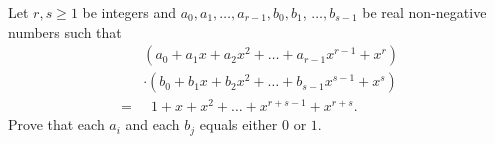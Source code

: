 \documentclass{article}
\begin{document}
\setlength{\parindent}{0pt}
Let $r,s\ge1$ be integers and $a_{0},a_{1},\dots,a_{r-1},b_{0},b_{1}$, $\dots,b_{s-1}$ be real non-negative numbers such that
\begin{align*}
&(a_{0}+a_{1}x+a_{2}x^{2}+\dots+a_{r-1}x^{r-1}+x^{r})\\
&\cdot(b_{0}+b_{1}x+b_{2}x^{2}+\dots+b_{s-1}x^{s-1}+x^{s})\\
=&\mathop{}1+x+x^{2}+\dots+x^{r+s-1}+x^{r+s}.
\end{align*}
Prove that each $a_{i}$ and each $b_{j}$ equals either $0$ or $1$.
\end{document}
